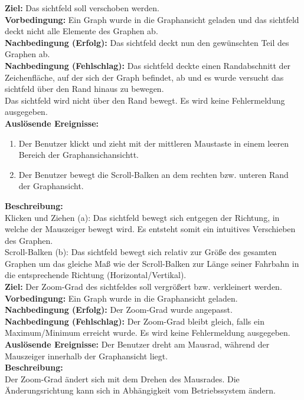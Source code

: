 \label{fa:verschieben}
\textbf{Ziel:} Das \gls{sichtfeld} soll verschoben werden.\\
\textbf{Vorbedingung:} Ein Graph wurde in die Graphansicht geladen und das \gls{sichtfeld} deckt nicht alle Elemente des Graphen ab.\\
\textbf{Nachbedingung (Erfolg):}  Das \gls{sichtfeld} deckt nun den gewünschten Teil des Graphen ab.\\
\textbf{Nachbedingung (Fehlschlag):} Das \gls{sichtfeld} deckte einen Randabschnitt der Zeichenfläche, auf der sich der Graph befindet, ab und es wurde versucht das \gls{sichtfeld} über den Rand hinaus zu bewegen.\\
Das \gls{sichtfeld} wird nicht über den Rand bewegt. Es wird keine Fehlermeldung ausgegeben.\\
\textbf{Auslösende Ereignisse:}
\begin{enumerate}[nolistsep, label=(\alph*)]
  \item Der Benutzer klickt und zieht mit der mittleren Maustaste in einem leeren Bereich der Graphansichansichtt.
  \item Der Benutzer bewegt die Scroll-Balken an dem rechten bzw. unteren Rand der Graphansicht. %
\end{enumerate}
\textbf{Beschreibung:}\\
Klicken und Ziehen (a): Das \gls{sichtfeld} bewegt sich entgegen der Richtung, in welche der Mauszeiger bewegt wird. Es entsteht somit ein intuitives Verschieben des Graphen.\\
Scroll-Balken (b): Das \gls{sichtfeld} bewegt sich relativ zur Größe des gesamten Graphen um das gleiche Maß wie der Scroll-Balken zur Länge seiner Fahrbahn in die entsprechende Richtung (Horizontal/Vertikal).\\

\label{fa:zoom}
\textbf{Ziel:} Der Zoom-Grad des \gls{sichtfeld}es soll vergrößert bzw. verkleinert werden.\\
\textbf{Vorbedingung:} Ein Graph wurde in die Graphansicht geladen.\\
\textbf{Nachbedingung (Erfolg):} Der Zoom-Grad wurde angepasst.\\
\textbf{Nachbedingung (Fehlschlag):} Der Zoom-Grad bleibt gleich, falls ein Maximum/Minimum erreicht wurde. Es wird keine Fehlermeldung ausgegeben.\\
\textbf{Auslösende Ereignisse:} Der Benutzer dreht am Mausrad, während der Mauszeiger innerhalb der Graphansicht liegt.\\
\textbf{Beschreibung:}\\
Der Zoom-Grad ändert sich mit dem Drehen des Mausrades. Die Änderungsrichtung kann sich in Abhängigkeit vom Betriebssystem ändern.\\


